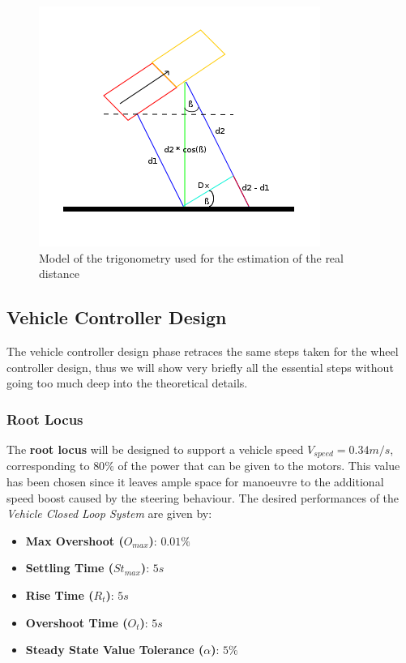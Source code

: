 \begin{figure}[H]
  \begin{center}
  \includegraphics[scale=0.7]{FIGURES_3/estimationAngle2.png}
    \caption[Trigonometry]{Model of the trigonometry used for the estimation of the real distance}
    \label{fig:TR model}
  \end{center}
\end{figure}

\subsection{Vehicle Controller Design}

The vehicle controller design phase retraces the same steps taken for the wheel controller design, thus we will show very briefly all the essential steps without going too much deep into the theoretical details.

\subsubsection{Root Locus}

The \textbf{root locus} will be designed to support a vehicle speed $V_{speed} = 0.34 m/s$, corresponding to $80\%$ of the power that can be given to the motors. This value has been chosen since it leaves ample space for manoeuvre to the additional speed boost caused by the steering behaviour. The desired performances of the \textit{Vehicle Closed Loop System} are given by:
\begin{itemize}
	\item \textbf{Max Overshoot ($O_{max}$)}: $0.01\%$
	\item \textbf{Settling Time ($St_{max}$)}: $5 s$
	\item \textbf{Rise Time ($R_t$)}: $5 s$
	\item \textbf{Overshoot Time ($O_t$)}: $5 s$
	\item \textbf{Steady State Value Tolerance ($\alpha{}$)}: $5\%$
\end{itemize}

